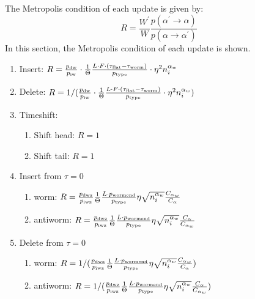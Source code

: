 \documentclass[12pt, two sided]{article}
\begin{document}
	The Metropolis condition of each update is given by:
	\begin{equation}
	R = \frac{W^\prime}{W} \frac{p(\alpha^\prime\to\alpha)}{p(\alpha\to\alpha^\prime)}
	\end{equation}
	In this section, the Metropolis condition of each update is shown.
	\begin{enumerate}
	\setcounter{enumi}{0}
		\item Insert: $R =  \frac{p_{\rm{dw}}}{p_{\rm{iw}}} \cdot \frac{1}{\Theta}  \frac{L \cdot F \cdot (\tau_{\rm{flat}}-\tau_{\rm{worm}})}{p_{\rm{type}}} \cdot \eta^2 n_i^{\alpha_w}$
		
		\item Delete: $R = 1/(\frac{p_{\rm{dw}}}{p_{\rm{iw}}} \cdot \frac{1}{\Theta}  \frac{L \cdot F \cdot (\tau_{\rm{flat}}-\tau_{\rm{worm}})}{p_{\rm{type}}} \cdot \eta^2 n_i^{\alpha_w} )$
		
		\item Timeshift: 		
		\begin{enumerate}
		\item{Shift head: $R =  1$}
		\item{Shift tail: $R = 1$}
		\end{enumerate}
		
		\item Insert from $\tau=0$
		\begin{enumerate}
		\item{worm: $R =  \frac{p_{\rm{dwz}}}{p_{\rm{iwz}}} \frac{1}{\Theta}  \frac{L \cdot p_{\rm{wormend}}}{p_{\rm{type}}} \eta \sqrt{n_i^{\alpha_w}} \frac{C_{\alpha_w}}{C_{\alpha}} $ }
		\item{antiworm: $R =  \frac{p_{\rm{dwz}}}{p_{\rm{iwz}}} \frac{1}{\Theta}  \frac{L \cdot p_{\rm{wormend}}}{p_{\rm{type}}} \eta \sqrt{n_i^{\alpha_w}} \frac{C_{\alpha}}{C_{\alpha_w}}$}
		\end{enumerate}
		
		\item Delete from $\tau=0$
		\begin{enumerate}
		\item{worm: $R =  1/(\frac{p_{\rm{dwz}}}{p_{\rm{iwz}}} \frac{1}{\Theta}  \frac{L \cdot p_{\rm{wormend}}}{p_{\rm{type}}} \eta \sqrt{n_i^{\alpha_w}} \frac{C_{\alpha_w}}{C_{\alpha}} ) $ }
		\item{antiworm: $R = 1/(\frac{p_{\rm{dwz}}}{p_{\rm{iwz}}} \frac{1}{\Theta}  \frac{L \cdot p_{\rm{wormend}}}{p_{\rm{type}}} \eta \sqrt{n_i^{\alpha_w}} \frac{C_{\alpha}}{C_{\alpha_w}})$}
		\end{enumerate}
		

\end{enumerate}
\end{document}
